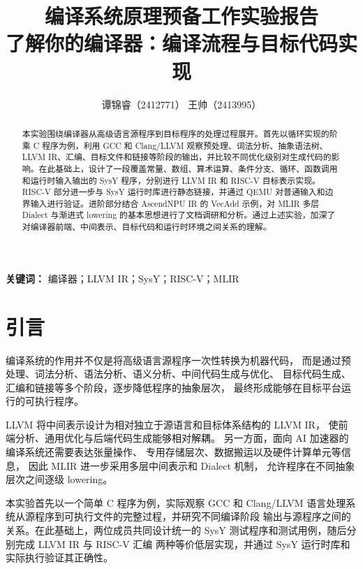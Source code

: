 \documentclass[12pt,a4paper]{ctexart}
\title{
\textbf{
编译系统原理预备工作实验报告\\[0.35em]
了解你的编译器：编译流程与目标代码实现
}
}
\author{
谭锦睿（2412771）
\quad
王帅（2413995）
}
\date{}
\begin{document}
\maketitle
\thispagestyle{empty}

\tableofcontents
\newpage

\begin{abstract}

本实验围绕编译器从高级语言源程序到目标程序的处理过程展开。首先以循环实现的阶乘 C 程序为例，利用 GCC 和 Clang/LLVM 观察预处理、词法分析、抽象语法树、LLVM IR、汇编、目标文件和链接等阶段的输出，并比较不同优化级别对生成代码的影响。在此基础上，设计了一段覆盖常量、数组、算术运算、条件分支、循环、函数调用和运行时输入输出的 SysY 程序，分别进行 LLVM IR 和 RISC-V 目标表示实现。RISC-V 部分进一步与 SysY 运行时库进行静态链接，并通过 QEMU 对普通输入和边界输入进行验证。进阶部分结合 AscendNPU IR 的 VecAdd 示例，对 MLIR 多层 Dialect 与渐进式 lowering 的基本思想进行了文档调研和分析。通过上述实验，加深了对编译器前端、中间表示、目标代码和运行时环境之间关系的理解。

\end{abstract}

\noindent
\textbf{关键词：}
编译器；LLVM IR；SysY；RISC-V；MLIR

\section{引言}

编译系统的作用并不仅是将高级语言源程序一次性转换为机器代码，
而是通过预处理、词法分析、语法分析、语义分析、中间代码生成与优化、
目标代码生成、汇编和链接等多个阶段，逐步降低程序的抽象层次，
最终形成能够在目标平台运行的可执行程序。

LLVM 将中间表示设计为相对独立于源语言和目标体系结构的 LLVM IR，
使前端分析、通用优化与后端代码生成能够相对解耦。
另一方面，面向 AI 加速器的编译系统还需要表达张量操作、
专用存储层次、数据搬运以及硬件计算单元等信息，
因此 MLIR 进一步采用多层中间表示和 Dialect 机制，
允许程序在不同抽象层次之间逐级 lowering。

本实验首先以一个简单 C 程序为例，实际观察 GCC 和 Clang/LLVM
语言处理系统从源程序到可执行文件的完整过程，并研究不同编译阶段
输出与源程序之间的关系。在此基础上，两位成员共同设计统一的
SysY 测试程序和测试用例，随后分别完成 LLVM IR 与 RISC-V 汇编
两种等价低层实现，并通过 SysY 运行时库和实际执行验证其正确性。
\end{document}
